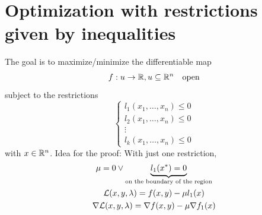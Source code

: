 \section{Optimization with restrictions given by inequalities}

The goal is to maximize/minimize the differentiable map
\begin{equation*}
    f: u\to\mathbb{R}, u\subseteq\mathbb{R}^n \quad \text{open}
\end{equation*}
subject to the restrictions
\begin{equation*}
    \begin{cases*}
        l_1(x_1,\ldots,x_n) \leq 0\\
        l_2(x_1,\ldots,x_n) \leq 0\\
        \vdots\\
        l_k(x_1,\ldots,x_n) \leq 0
    \end{cases*}
\end{equation*}
with $x\in\mathbb{R}^n$.
Idea for the proof: With just one restriction, 
\begin{gather*}
    \mu=0 \lor\underbrace{l_1(x^*)=0}_{\text{on the boundary of the region}}\\
    \mathcal{L}(x,y,\lambda) = f(x,y) - \mu l_1(x)\\
    \nabla\mathcal{L}(x,y,\lambda) = \nabla f(x,y) - \mu\nabla f_1(x)
\end{gather*}

